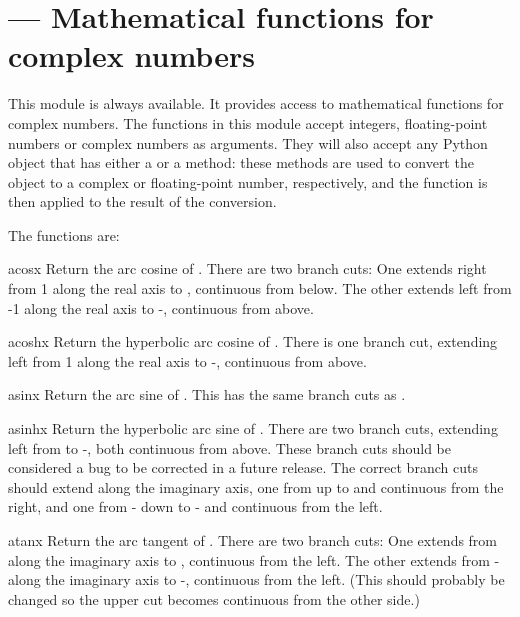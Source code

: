 \section{ ---
         Mathematical functions for complex numbers}


This module is always available.  It provides access to mathematical
functions for complex numbers.  The functions in this module accept
integers, floating-point numbers or complex numbers as arguments.
They will also accept any Python object that has either a
 or a  method: these methods are
used to convert the object to a complex or floating-point number, respectively, and
the function is then applied to the result of the conversion.

The functions are:

\begin{funcdesc}{acos}{x}
Return the arc cosine of .
There are two branch cuts:
One extends right from 1 along the real axis to \infinity, continuous
from below.
The other extends left from -1 along the real axis to -\infinity,
continuous from above.
\end{funcdesc}

\begin{funcdesc}{acosh}{x}
Return the hyperbolic arc cosine of .
There is one branch cut, extending left from 1 along the real axis
to -\infinity, continuous from above.
\end{funcdesc}

\begin{funcdesc}{asin}{x}
Return the arc sine of .
This has the same branch cuts as .
\end{funcdesc}

\begin{funcdesc}{asinh}{x}
Return the hyperbolic arc sine of .
There are two branch cuts, extending left from \plusminus{} to
\plusminus-\infinity{}, both continuous from above.
These branch cuts should be considered a bug to be corrected in a
future release.
The correct branch cuts should extend along the imaginary axis,
one from  up to \infinity{} and continuous from the
right, and one from - down to -\infinity{} and
continuous from the left.
\end{funcdesc}

\begin{funcdesc}{atan}{x}
Return the arc tangent of .
There are two branch cuts:
One extends from  along the imaginary axis to
\infinity{}, continuous from the left.
The other extends from - along the imaginary axis to
-\infinity{}, continuous from the left.
(This should probably be changed so the upper cut becomes continuous
from the other side.)
\end{funcdesc}

